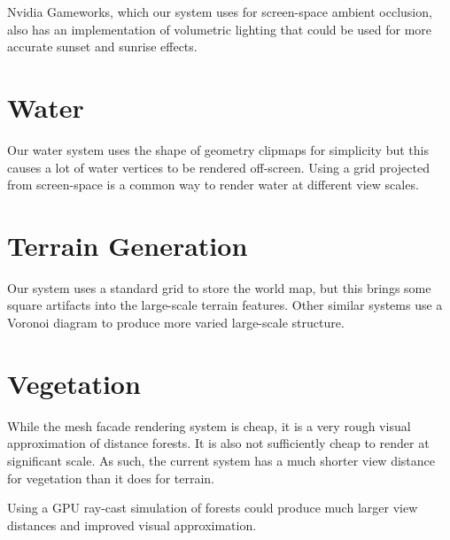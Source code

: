Nvidia Gameworks, which our system uses for screen-space ambient occlusion, also has an implementation of volumetric lighting that could be used for more accurate sunset and sunrise effects.


\section{Water}

Our water system uses the shape of geometry clipmaps for simplicity but this causes a lot of water vertices to be rendered off-screen.
Using a grid projected from screen-space is a common way to render water at different view scales.


\section{Terrain Generation}

Our system uses a standard grid to store the world map, but this brings some square artifacts into the large-scale terrain features.
Other similar systems use a Voronoi diagram to produce more varied large-scale structure.


\section{Vegetation}

While the mesh facade rendering system is cheap, it is a very rough visual approximation of distance forests.
It is also not sufficiently cheap to render at significant scale.
As such, the current system has a much shorter view distance for vegetation than it does for terrain.

Using a GPU ray-cast simulation of forests could produce much larger view distances and improved visual approximation. \cite{terraintreecast}
